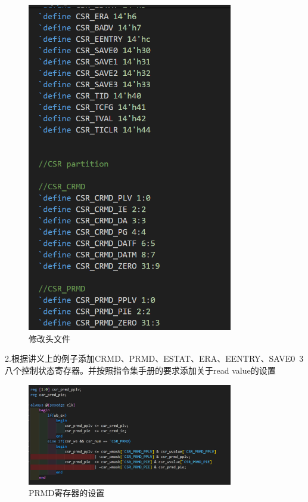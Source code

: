 \documentclass[12pt,a4paper]{article}
\begin{document}
            \begin{figure}[H]
                \centering
                \includegraphics[width=0.8\textwidth,height=0.5\textheight]{创建CSR-2.png}
                \caption{修改头文件}
            \end{figure}
            \par
            2.根据讲义上的例子添加CRMD、PRMD、ESTAT、ERA、EENTRY、SAVE0~3八个控制状态寄存器。并按照指令集手册的要求添加关于read value的设置
            \begin{figure}[H]
                \centering
                \includegraphics[width=0.8\textwidth]{PRMD.png}
                \caption{PRMD寄存器的设置}
            \end{figure}
\end{document}
